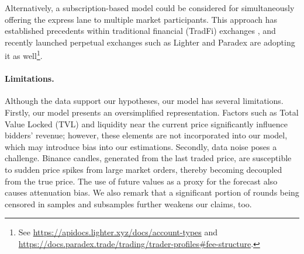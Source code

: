 Alternatively, a subscription-based model could be considered for simultaneously offering the express lane to multiple market participants. This approach has established precedents within traditional financial (TradFi) exchanges \cite{budish2024theory}, and recently launched perpetual exchanges such as Lighter and Paradex are adopting it as well\footnote{See \url{https://apidocs.lighter.xyz/docs/account-types} and \url{https://docs.paradex.trade/trading/trader-profiles\#fee-structure}.}.

\paragraph*{Limitations.}
Although the data support our hypotheses, our model has several limitations. Firstly, our model presents an oversimplified representation. Factors such as Total Value Locked (TVL) and liquidity near the current price significantly influence bidders' revenue; however, these elements are not incorporated into our model, which may introduce bias into our estimations. Secondly, data noise poses a challenge. Binance candles, generated from the last traded price, are susceptible to sudden price spikes from large market orders, thereby becoming decoupled from the true price. The use of future values as a proxy for the forecast also causes attenuation bias. We also remark that a significant portion of rounds being censored in samples and subsamples further weakens our claims, too.
